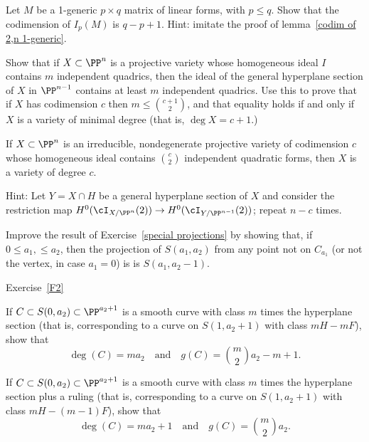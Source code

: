 \begin{exercise}
Let $M$ be a 1-generic $p\times q$ matrix of linear forms, with $p\leq q$. Show that the codimension of
$I_p(M)$ is $q-p+1$. Hint: imitate the proof of lemma~\ref{codim of 2,n 1-generic}.
\end{exercise}

\begin{exercise}
Show that if $X\subset \PP^n$ is a projective variety whose homogeneous ideal $I$ contains $m$ independent quadrics, then the ideal of the general hyperplane section of $X$ in $\PP^{n-1}$
contains at least $m$ independent quadrics. Use this to prove that if $X$ has codimension $c$ then $m\leq {c+1\choose 2}$, and that equality holds if and only if
$X$ is a variety of minimal degree (that is, $\deg X = c+1$.)
\end{exercise}

\begin{exercise}\label{many quadrics}
 If $X \subset \PP^n$ is an irreducible, nondegenerate projective variety of codimension $c$ whose homogeneous ideal
 contains ${c\choose 2}$ independent quadratic forms, then $X$ is a variety of degree $c$.
 
Hint: Let $Y = X \cap H$ be a general hyperplane section of $X$ and consider the restriction map $H^0(\cI_{X/\PP^n}(2)) \to H^0(\cI_{Y/\PP^{n-1}}(2))$; repeat $n-c$ times.
\end{exercise}

\begin{exercise}\label{general projections}
Improve the result of Exercise~\ref{special projections} by showing that, if $0\leq a_1,\leq a_2$, then
 the projection of $S(a_1,a_2)$ from any point not on $C_{a_1}$ (or not the vertex, in case $a_1=0$) is 
 is $S(a_1, a_2-1)$.
\end{exercise}

Exercise~\ref{F2}
\begin{exercise}\label{curves on cones}
\item If $C \subset S(0, a_2) \subset \PP^{a_2+1}$ is a smooth curve with class $m$ times the hyperplane section (that is, corresponding to a curve on $S(1,a_2+1)$ with class $mH - mF$), show that
$$
\deg(C) = ma_2 \quad \text{and} \quad g(C) = \binom{m}{2}a_2 - m + 1.
$$
\item If $C \subset S(0, a_2) \subset \PP^{a_2+1}$ is a smooth curve with class $m$ times the hyperplane section plus a ruling (that is, corresponding to a curve on $S(1,a_2+1)$ with class $mH - (m-1)F$), show that
$$
\deg(C) = ma_2 + 1 \quad \text{and} \quad g(C) = \binom{m}{2}a_2.
$$
\end{exercise}

